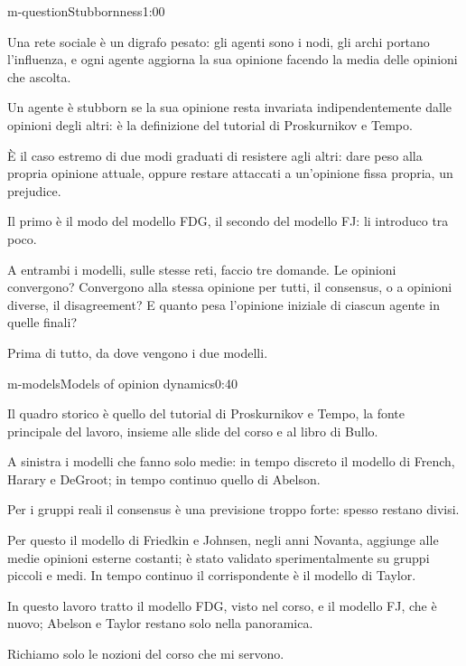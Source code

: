 \begin{slide}{m-question}{Stubbornness}{1:00}
  \begin{discorso}
    \item Una rete sociale è un digrafo pesato: gli agenti sono i nodi, gli archi portano l'influenza, e ogni agente aggiorna la sua opinione facendo la media delle opinioni che ascolta.
    \item Un agente è stubborn se la sua opinione resta invariata indipendentemente dalle opinioni degli altri: è la definizione del tutorial di Proskurnikov e Tempo.
    \item È il caso estremo di due modi graduati di resistere agli altri: dare peso alla propria opinione attuale, oppure restare attaccati a un'opinione fissa propria, un prejudice.
    \item Il primo è il modo del modello FDG, il secondo del modello FJ: li introduco tra poco.
    \item A entrambi i modelli, sulle stesse reti, faccio tre domande. Le opinioni convergono? Convergono alla stessa opinione per tutti, il consensus, o a opinioni diverse, il disagreement? E quanto pesa l'opinione iniziale di ciascun agente in quelle finali?
    \item Prima di tutto, da dove vengono i due modelli.
  \end{discorso}
\end{slide}

\begin{slide}{m-models}{Models of opinion dynamics}{0:40}
  \begin{discorso}
    \item Il quadro storico è quello del tutorial di Proskurnikov e Tempo, la fonte principale del lavoro, insieme alle slide del corso e al libro di Bullo.
    \item A sinistra i modelli che fanno solo medie: in tempo discreto il modello di French, Harary e DeGroot; in tempo continuo quello di Abelson.
    \item Per i gruppi reali il consensus è una previsione troppo forte: spesso restano divisi.
    \item Per questo il modello di Friedkin e Johnsen, negli anni Novanta, aggiunge alle medie opinioni esterne costanti; è stato validato sperimentalmente su gruppi piccoli e medi. In tempo continuo il corrispondente è il modello di Taylor.
    \item In questo lavoro tratto il modello FDG, visto nel corso, e il modello FJ, che è nuovo; Abelson e Taylor restano solo nella panoramica.
    \item Richiamo solo le nozioni del corso che mi servono.
  \end{discorso}
\end{slide}

